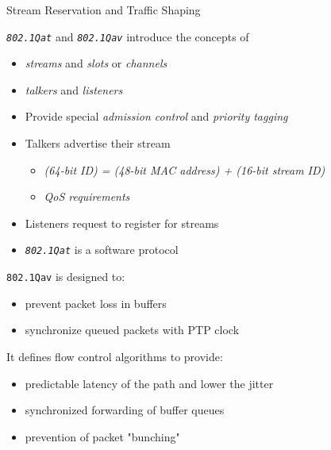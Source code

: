 \documentclass{beamer}
\begin{document}

\begin{frame}[allowframebreaks]{ Stream Reservation and Traffic Shaping }

\emph{\texttt{802.1Qat}} and \emph{\texttt{802.1Qav}} introduce the concepts of
\begin{itemize}
	\item \emph{streams} and \emph{slots} or \emph{channels}
	\item \emph{talkers} and \emph{listeners}
\end{itemize}

\begin{itemize}

	\item Provide special \emph{admission control} and \emph{priority tagging}

	\item Talkers advertise their stream

	\begin{itemize}
		\item \emph{(64-bit ID) = (48-bit MAC address) + (16-bit stream ID)}
		\item \emph{QoS requirements}
	\end{itemize}

	\item Listeners request to register for streams

	\item \emph{\texttt{802.1Qat}} is a software protocol

\end{itemize}

\break

\texttt{802.1Qav} is designed to:

\begin{itemize}
	\item prevent packet loss in buffers
	\item synchronize queued packets with PTP clock
\end{itemize}

It defines flow control algorithms to provide:

\begin{itemize}
	\item predictable latency of the path and lower the jitter
	\item synchronized forwarding of buffer queues
	\item prevention of packet "bunching"
\end{itemize}


\end{frame}
\end{document}

